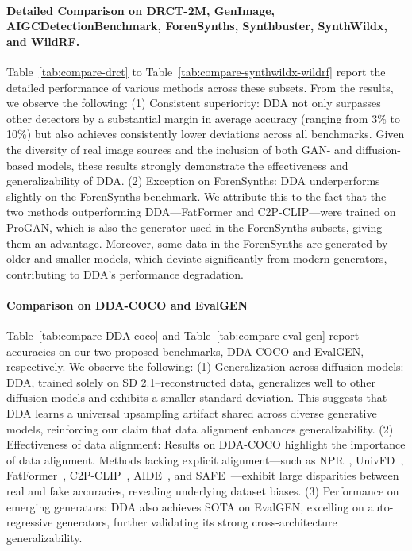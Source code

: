 \documentclass{article}
\begin{document}
\paragraph{Detailed Comparison on DRCT-2M, GenImage, AIGCDetectionBenchmark, ForenSynths, Synthbuster, SynthWildx, and WildRF.}
Table~\ref{tab:compare-drct} to Table~\ref{tab:compare-synthwildx-wildrf} report the detailed performance of various methods across these subsets. From the results, we observe the following:
(1) Consistent superiority: DDA not only surpasses other detectors by a substantial margin in average accuracy (ranging from 3\% to 10\%) but also achieves consistently lower deviations across all benchmarks. Given the diversity of real image sources and the inclusion of both GAN- and diffusion-based models, these results strongly demonstrate the effectiveness and generalizability of DDA.
(2) Exception on ForenSynths: DDA underperforms slightly on the ForenSynths benchmark. We attribute this to the fact that the two methods outperforming DDA—FatFormer and C2P-CLIP—were trained on ProGAN, which is also the generator used in the ForenSynths subsets, giving them an advantage. Moreover, some data in the ForenSynths are generated by older and smaller models, which deviate significantly from modern generators, contributing to DDA’s performance degradation.


\paragraph{Comparison on DDA-COCO and EvalGEN}
Table~\ref{tab:compare-DDA-coco} and Table~\ref{tab:compare-eval-gen} report accuracies on our two proposed benchmarks, DDA-COCO and EvalGEN, respectively. We observe the following:
(1) Generalization across diffusion models: DDA, trained solely on SD 2.1–reconstructed data, generalizes well to other diffusion models and exhibits a smaller standard deviation. This suggests that DDA learns a universal upsampling artifact shared across diverse generative models, reinforcing our claim that data alignment enhances generalizability.
(2) Effectiveness of data alignment: Results on DDA-COCO highlight the importance of data alignment. Methods lacking explicit alignment—such as NPR~\cite{cozzolino2024zero}, UnivFD~\cite{ojha2023towards}, FatFormer~\cite{liu2024forgery}, C2P-CLIP~\cite{tan2024c2p}, AIDE~\cite{yan2024sanity}, and SAFE~\cite{li2024improving}—exhibit large disparities between real and fake accuracies, revealing underlying dataset biases.
(3) Performance on emerging generators: DDA also achieves SOTA on EvalGEN, excelling on auto-regressive generators, further validating its strong cross-architecture generalizability.
\end{document}
